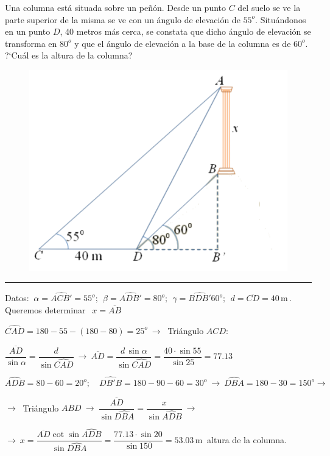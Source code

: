 \begin{miejercicio}

\begin{multicols}{2}

Una columna está situada sobre un peñón. 
Desde un punto $C$ del suelo se ve la parte superior de la misma se ve con un ángulo de elevación de $55^o$. 
Situándonos en un punto $D$, 40 metros más cerca, se constata que dicho ángulo de elevación se transforma en $80^o$ y que el ángulo de elevación a la base de la columna es de $60^o$. ?`Cuál es la altura de la columna?
 
	\begin{figure}[H]
	\centering
	\includegraphics[width=.45\textwidth]{img-triang/triang20.png}
\end{figure}
\end{multicols}
\vspace{-6mm}
\rule{250pt}{0.1pt}

\vspace{2mm} Datos: $\ \alpha=\widehat{ACB'}=55^o;\ \ \beta=\widehat{ADB'}=80^o;\ \ \gamma=\widehat{BDB'}60^o; \ \ d=\overline{CD}=40\, \mathrm{m}\, . \ \ $  Queremos determinar $\ \ x=\overline{AB}$

\vspace{2mm} $\widehat{CAD}=180-55-(180-80)=25^o \ \to \ $ Triángulo $ ACD:$

\vspace{2mm} $\dfrac{\overline{AD}}{\sin \alpha}=\dfrac{d}{\sin \widehat{CAD}} \ \to \ \overline{AD}=\dfrac{d\, \sin \alpha}{\sin \widehat{CAD}}=\dfrac{40\cdot \sin 55}{\sin 25}=77.13$

\vspace{2mm} $\widehat{ADB}=80-60=20^o;\quad \widehat{DB'B}=180-90-60=30^o \ \to \ \widehat{DBA}=180-30=150^o \to \ $ 

\vspace{2mm}$\to \ $ Triángulo $ ABD \ \to \ 
\dfrac{\overline{AD}}{\sin \widehat{DBA}}=\dfrac{x}{\sin \widehat{ADB}} \ \to \ $

\vspace{2mm} $\to \ x=\dfrac{\overline{AD}\cot \sin \widehat{ADB}}{\sin \widehat{DBA}}=\dfrac{77.13\cdot \sin 20}{\sin 150}=53.03\, \mathrm{m} \ $ altura de la columna.

\end{miejercicio}


